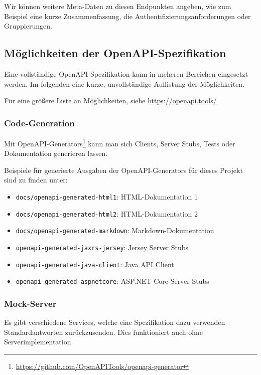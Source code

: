 Wir können weitere Meta-Daten zu diesen Endpunkten angeben, wie zum Beispiel eine kurze Zusammenfassung, die Authentifizierungsanforderungen oder Gruppierungen.

\subsection{Möglichkeiten der OpenAPI-Spezifikation}
Eine vollständige OpenAPI-Spezifikation kann in meheren Bereichen eingesetzt werden. 
Im folgenden eine kurze, unvollständige Auflistung der Möglichkeiten.

Für eine größere Liste an Möglichkeiten, siehe \url{https://openapi.tools/}

\subsubsection*{Code-Generation}

Mit OpenAPI-Generators\footnote{\url{https://github.com/OpenAPITools/openapi-generator}} kann man sich Clients, Server Stubs, Tests oder Dokumentation generieren lassen.

Beispiele für generierte Ausgaben der OpenAPI-Generators für dieses Projekt sind zu finden unter:
\begin{itemize}
    \item \texttt{docs/openapi-generated-html1}: HTML-Dokumentation 1
    \item \texttt{docs/openapi-generated-html2}: HTML-Dokumentation 2
    \item \texttt{docs/openapi-generated-markdown}: Markdown-Dokumentation
    \item \texttt{openapi-generated-jaxrs-jersey}: Jersey Server Stubs
    \item \texttt{openapi-generated-java-client}: Java API Client
    \item \texttt{openapi-generated-aspnetcore}: ASP.NET Core Server Stubs
\end{itemize}

\subsubsection*{Mock-Server}

Es gibt verschiedene Services, welche eine Spezifikation dazu verwenden Standardantworten zurückzusenden. Dies funktioniert auch ohne Serverimplementation.
